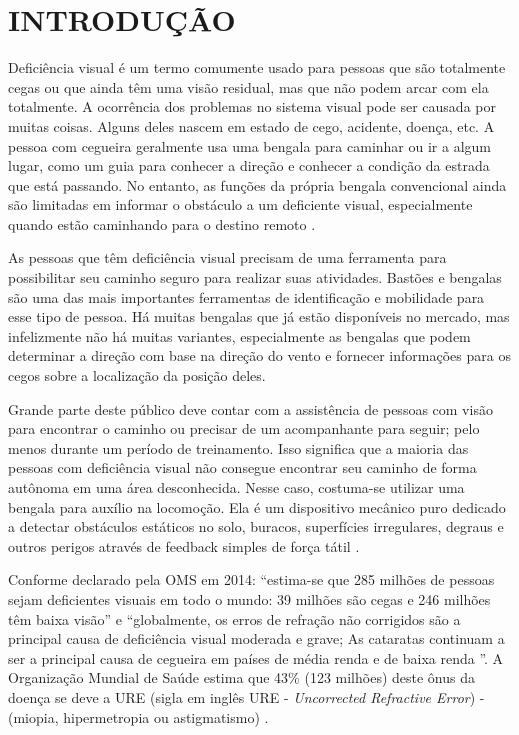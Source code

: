 \chapter[Introdução]{INTRODUÇÃO}

Deficiência visual é um termo comumente usado para pessoas que são totalmente cegas ou que ainda têm uma visão residual, mas que não podem arcar com ela totalmente. A ocorrência dos problemas no sistema visual pode ser causada por muitas coisas. Alguns deles nascem em estado de cego, acidente, doença, etc. A pessoa com cegueira geralmente usa uma bengala para caminhar ou ir a algum lugar, como um guia para conhecer a direção e conhecer a condição da estrada que está passando. No entanto, as funções da própria bengala convencional ainda são limitadas em informar o obstáculo a um deficiente visual, especialmente quando estão caminhando para o destino remoto \cite{Mutiara2016}. 

As pessoas que têm deficiência visual precisam de uma ferramenta para possibilitar seu caminho seguro para realizar suas atividades. Bastões e bengalas são uma das mais importantes ferramentas de identificação e mobilidade para esse tipo de pessoa. Há muitas bengalas que já estão disponíveis no mercado, mas infelizmente não há muitas variantes, especialmente as bengalas que podem determinar a direção com base na direção do vento e fornecer informações para os cegos sobre a localização da posição deles.

Grande parte deste público deve contar com a assistência de pessoas com visão para encontrar o caminho ou precisar de um acompanhante para seguir; pelo menos durante um período de treinamento. Isso significa que a maioria das pessoas com deficiência visual não consegue encontrar seu caminho de forma autônoma em uma área desconhecida. Nesse caso, costuma-se utilizar uma bengala para auxílio na locomoção. Ela é um dispositivo mecânico puro dedicado a detectar obstáculos estáticos no solo, buracos, superfícies irregulares, degraus e outros perigos através de feedback simples de força tátil \cite{Sakhardande2012}.

Conforme declarado pela OMS em 2014: “estima-se que 285 milhões de pessoas sejam deficientes visuais em todo o mundo: 39 milhões são cegas e 246 milhões têm baixa visão” e “globalmente, os erros de refração não corrigidos são a principal causa de deficiência visual moderada e grave; As cataratas continuam a ser a principal causa de cegueira em países de média renda e de baixa renda ”. A Organização Mundial de Saúde estima que 43\% (123 milhões) deste ônus da doença se deve a URE (sigla em inglês URE - \textit{Uncorrected Refractive Error}) - (miopia, hipermetropia ou astigmatismo) \cite{Contreras2017}.

